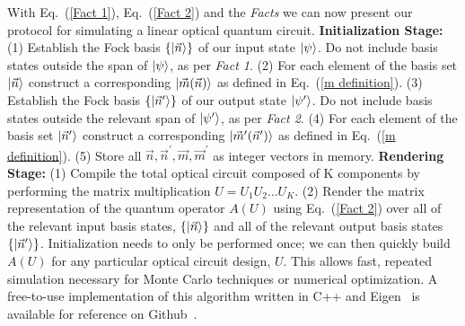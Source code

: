 \documentclass[aps,pra,twocolumn,showpacs,superscriptaddress,floatfix,10pt]{revtex4}
\begin{document}
With Eq.~(\ref{Fact 1}), Eq.~(\ref{Fact 2}) and the \textit{Facts } we can now present our protocol for simulating a linear optical quantum circuit.
\newline
\newline
\textbf{Initialization Stage:}
\newline
\newline
		(1)  Establish the Fock basis $\{\ket{\vec{n}} \}$ of our input state $\ket{\psi}$. Do not include basis states outside the span of $\ket{\psi}$, as per \textit{Fact 1}.
		\newline
		\newline
		(2) For each element of the basis set $\ket{\vec{n}}$ construct a corresponding $\ket{\vec{m}(\vec{n})}$ as defined in Eq.~(\ref{m definition}).
		\newline
		\newline
		(3) Establish the Fock basis $\{\ket{\vec{n}^\prime}\}$ of our output state $\ket{\psi^\prime}$. Do not include basis states outside the relevant span of $\ket{\psi^\prime}$, as per \textit{Fact 2}.
		\newline
		\newline
		(4)  For each element of the basis set $\ket{\vec{n}^\prime}$ construct a corresponding $\ket{\vec{m}^\prime(\vec{n}^\prime)}$ as defined in Eq.~(\ref{m definition}).
		\newline
		\newline
		(5) Store all $\vec{n}, \vec{n}^\prime, \vec{m}, \vec{m}^\prime$ as integer vectors in memory.
		\newline
		\newline
\textbf{Rendering Stage:}
\newline
\newline
		(1)  Compile the total optical circuit composed of K components by performing the matrix multiplication $ U = U_1 U_2 \dots U_K $.
		\newline
		\newline
		(2) Render the matrix representation of the quantum operator $A(U)$ using Eq.~(\ref{Fact 2}) over all of the relevant input basis states, $\{\ket{\vec{n}}\}$ and all of the relevant output basis states $\{\ket{\vec{n}^\prime}\}$.
\newline
\newline
 Initialization needs to only be performed once; we can then quickly build $A(U)$ for any particular optical circuit design, $U$. This allows fast, repeated simulation necessary for Monte Carlo techniques or numerical optimization. A free-to-use implementation of this algorithm written in C++ and Eigen~\cite{EIGEN} is available for reference on Github~\cite{GitHub}.
\end{document}
